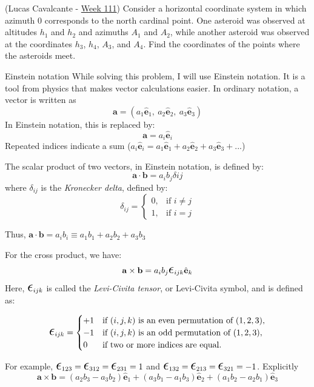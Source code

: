 \documentclass[11pt]{article}
\begin{document}
\begin{pproblem}(Lucas Cavalcante - \href{https://noic.com.br/olimpiadas/astronomia/problemas-da-semana/astronomia-semana-111/}{Week 111})
    Consider a horizontal coordinate system in which azimuth \(0\) corresponds to the north cardinal point. One asteroid was observed at altitudes \(h_1\) and \(h_2\) and azimuths \(A_1\) and \(A_2\), while another asteroid was observed at the coordinates \(h_3\), \(h_4\), \(A_3\), and \(A_4\). Find the coordinates of the points where the asteroids meet.
    
    \begin{psidea}{Einstein notation}{}
    While solving this problem, I will use Einstein notation. It is a tool from physics that makes vector calculations easier. In ordinary notation, a vector is written as
    \[\mathbf{a} = (a_1 \hat{\mathbf{e}}_1, \ a_2 \hat{\mathbf{e}}_2, \ a_3 \hat{\mathbf{e}}_3)\]
    In Einstein notation, this is replaced by:
    \[\mathbf{a} = a_i \hat{\mathbf{e}}_i\]
    Repeated indices indicate a sum (\(a_i \hat{\mathbf{e}}_i = a_1 \hat{\mathbf{e}}_1 + a_2 \hat{\mathbf{e}}_2 + a_3 \hat{\mathbf{e}}_3 + ...\))
    
    The scalar product of two vectors, in Einstein notation, is defined by:
    \[\mathbf{a}\cdot \mathbf{b} = a_ib_j\delta{ij}\]
    where \(\delta_{ij}\) is the \textit{Kronecker delta}, defined by:
    \[\delta_{ij} = \left \{ \begin{matrix} 0, & \mbox{if } i \ne j \\ 
                                            1, & \mbox{if } i = j\end{matrix} \right.\]
    
    Thus, \(\mathbf{a}\cdot \mathbf{b} = a_i b_i \equiv a_1 b_1 + a_2 b_2 + a_3 b_3\)

    For the cross product, we have:
        \[
        \mathbf{a} \times \mathbf{b} = a_i b_j \Epsilon_{ijk} \hat{\mathbf{e}}_k
        \]
        Here, \(\Epsilon_{ijk}\) is called the \textit{Levi-Civita tensor}, or Levi-Civita symbol, and is defined as:
    
        \[
        \Epsilon_{ijk} = 
        \begin{cases} 
        +1 & \text{if } (i, j, k) \text{ is an even permutation of } (1, 2, 3), \\
        -1 & \text{if } (i, j, k) \text{ is an odd permutation of } (1, 2, 3), \\
        0 & \text{if two or more indices are equal}.
        \end{cases}
        \]

        For example, \(\Epsilon_{123} = \Epsilon_{312} = \Epsilon_{231} = 1\) and \(\Epsilon_{132} = \Epsilon_{213} = \Epsilon_{321} = -1\).
        Explicitly 
        \[\mathbf{a} \times \mathbf{b} = (a_2 b_3 - a_3 b_2) \hat{\mathbf{e}}_1 + (a_3 b_1 - a_1 b_3) \hat{\mathbf{e}}_2 + (a_1 b_2 - a_2 b_1) \hat{\mathbf{e}}_3\]
    \end{psidea}

\end{pproblem}
\end{document}
